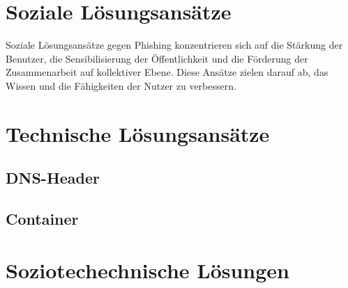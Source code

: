 \documentclass[journal=tosc,final]{iacrtrans}
\begin{document}
\section{Soziale Lösungsansätze}
Soziale Lösungsansätze gegen Phishing konzentrieren sich auf die Stärkung der Benutzer, die Sensibilisierung der Öffentlichkeit und die Förderung der Zusammenarbeit auf kollektiver Ebene. Diese Ansätze zielen darauf ab, das Wissen und die Fähigkeiten der Nutzer zu verbessern.
\section{Technische Lösungsansätze}
\subsection{DNS-Header}
\subsection{Container}
\section{Soziotechechnische Lösungen}


\end{document}
